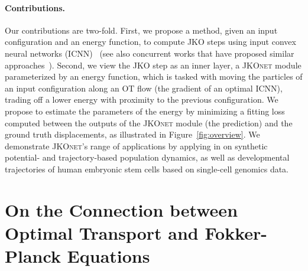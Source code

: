 \paragraph{Contributions.}\hspace{1em} Our contributions are two-fold. First, we propose a method, given an input configuration and an energy function, to compute JKO steps using input convex neural networks (ICNN)~\citep{amos2017input,makkuva2020optimal} (see also concurrent works that have proposed similar approaches~\citep{alvarez2021optimizing, mokrov2021large}). Second, we view the JKO step as an inner layer, a \textsc{JKOnet} module parameterized by an energy function, which is tasked with moving the particles of an input configuration along an OT flow (the gradient of an optimal ICNN), trading off a lower energy with proximity to the previous configuration.
We propose to estimate the parameters of the energy by minimizing a fitting loss %
computed between the outputs of the \textsc{JKOnet} module (the prediction) and the ground truth displacements, as illustrated in Figure~\ref{fig:overview}.
We demonstrate \textsc{JKOnet}'s range of applications by applying in on synthetic potential- and trajectory-based population dynamics, as well as developmental trajectories of human embryonic stem cells based on single-cell genomics data.


\section[On the Connection between OT and Fokker-Planck Equations]{On the Connection between Optimal Transport and Fokker-Planck Equations}

